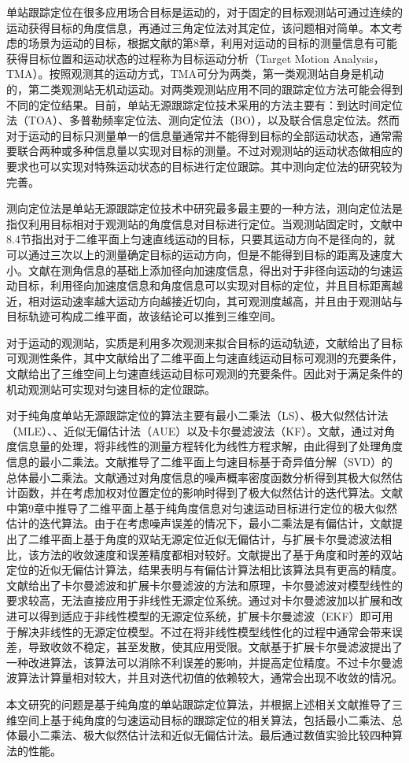 单站跟踪定位在很多应用场合目标是运动的，对于固定的目标观测站可通过连续的运动获得目标的角度信息，再通过三角定位法对其定位，该问题相对简单。本文考虑的场景为运动的目标，根据文献\cite{10}的第8章，利用对运动的目标的测量信息有可能获得目标位置和运动状态的过程称为目标运动分析（Target Motion Analysis，TMA）。按照观测其的运动方式，TMA可分为两类，第一类观测站自身是机动的，第二类观测站无机动运动。对两类观测站应用不同的跟踪定位方法可能会得到不同的定位结果。目前，单站无源跟踪定位技术采用的方法主要有\cite{11}：到达时间定位法（TOA）、多普勒频率定位法、测向定位法（BO），以及联合信息定位法。然而对于运动的目标只测量单一的信息量通常并不能得到目标的全部运动状态，通常需要联合两种或多种信息量以实现对目标的测量。不过对观测站的运动状态做相应的要求也可以实现对特殊运动状态的目标进行定位跟踪。其中测向定位法的研究较为完善。

测向定位法是单站无源跟踪定位技术中研究最多最主要的一种方法，测向定位法是指仅利用目标相对于观测站的角度信息对目标进行定位。当观测站固定时，文献\cite{10}中8.4节指出对于二维平面上匀速直线运动的目标，只要其运动方向不是径向的，就可以通过三次以上的测量确定目标的运动方向，但是不能得到目标的距离及速度大小。文献\cite{12}在测角信息的基础上添加径向加速度信息，得出对于非径向运动的匀速运动目标，利用径向加速度信息和角度信息可以实现对目标的定位，并且目标距离越近，相对运动速率越大运动方向越接近切向，其可观测度越高，并且由于观测站与目标轨迹可构成二维平面，故该结论可以推到三维空间。

对于运动的观测站，实质是利用多次观测来拟合目标的运动轨迹，文献\cite{bo1}\cite{bo2}给出了目标可观测性条件，其中文献\cite{bo1}给出了二维平面上匀速直线运动目标可观测的充要条件，文献\cite{bo2}给出了三维空间上匀速直线运动目标可观测的充要条件。因此对于满足条件的机动观测站可实现对匀速目标的定位跟踪。

对于纯角度单站无源跟踪定位的算法主要有最小二乘法（LS）、极大似然估计法（MLE）、、近似无偏估计法（AUE）以及卡尔曼滤波法（KF）。文献\cite{15}，\cite{wls2}通过对角度信息量的处理，将非线性的测量方程转化为线性方程求解，由此得到了处理角度信息的最小二乘法。文献\cite{16}推导了二维平面上匀速目标基于奇异值分解（SVD）的总体最小二乘法。文献\cite{15}通过对角度信息的噪声概率密度函数分析得到其极大似然估计函数，并在考虑加权对位置定位的影响时得到了极大似然估计的迭代算法。文献\cite{10}中第9章中推导了二维平面上基于纯角度信息对匀速运动目标进行定位的极大似然估计的迭代算法。由于在考虑噪声误差的情况下，最小二乘法是有偏估计，文献\cite{17}提出了二维平面上基于角度的双站无源定位近似无偏估计，与扩展卡尔曼滤波法相比，该方法的收敛速度和误差精度都相对较好。文献\cite{18}提出了基于角度和时差的双站定位的近似无偏估计算法，结果表明与有偏估计算法相比该算法具有更高的精度。文献\cite{19}给出了卡尔曼滤波和扩展卡尔曼滤波的方法和原理，卡尔曼滤波对模型线性的要求较高，无法直接应用于非线性无源定位系统。通过对卡尔曼滤波加以扩展和改进可以得到适应于非线性模型的无源定位系统，扩展卡尔曼滤波（EKF）即可用于解决非线性的无源定位模型。不过在将非线性模型线性化的过程中通常会带来误差，导致收敛不稳定，甚至发散，使其应用受限。文献\cite{20}基于扩展卡尔曼滤波提出了一种改进算法，该算法可以消除不利误差的影响，并提高定位精度。不过卡尔曼滤波算法计算量相对较大，并且对迭代初值的依赖较大，通常会出现不收敛的情况。

本文研究的问题是基于纯角度的单站跟踪定位算法，并根据上述相关文献推导了三维空间上基于纯角度的匀速运动目标的跟踪定位的相关算法，包括最小二乘法、总体最小二乘法、极大似然估计法和近似无偏估计法。最后通过数值实验比较四种算法的性能。
